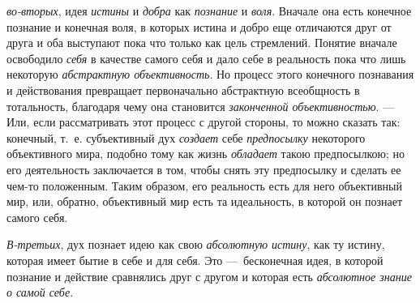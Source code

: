 \documentclass[twoside]{article}
\begin{document}
{{{{\em во-вторых}, идея
{\em истины} и
{\em добра} как
{\em познание} и
{\em воля}. Вначале она
есть конечное познание и конечная воля, в которых истина и добро еще
отличаются друг от друга и оба выступают пока что только как цель
стремлений. Понятие вначале освободило
{\em себя} в качестве
самого себя и дало себе в реальность пока что лишь некоторую
{\em абстрактную объективность}.
Но процесс этого конечного познавания и действования
превращает первоначально абстрактную всеобщность в тотальность, благодаря
чему она становится {\em законченной
объективностью}. — Или, если рассматривать этот процесс с
другой стороны, то можно сказать так: конечный, т.~е. субъективный дух
{\em создает} себе
{\em предпосылку}
некоторого объективного мира, подобно тому как жизнь
{\em обладает} такою
предпосылкою; но его деятельность заключается в том, чтобы
снять эту предпосылку и сделать ее чем-то положенным. Таким образом, его
реальность есть для него объективный мир, или, обратно, объективный мир
есть та идеальность, в которой он познает самого себя.

{\em В-третьих}, дух
познает идею как свою {\em абсолютную
истину}, как ту истину, которая имеет бытие в себе и для
себя. Это —~бесконечная идея, в которой познание и действие
сравнялись друг с другом и которая есть
{\em абсолютное знание о самой себе}.

}}}
\end{document}
